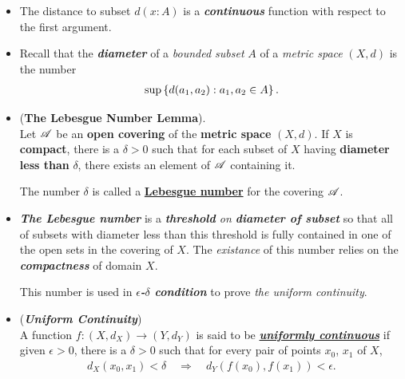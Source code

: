 \documentclass[11pt]{article}
\begin{document}
\begin{itemize}
\item \begin{remark}
The distance to subset $d(x: A)$ is a \emph{\textbf{continuous}} function with respect to the first argument.
\end{remark}


\item \begin{remark}
Recall that the \emph{\textbf{diameter}} of a \emph{bounded subset} $A$ of a \emph{metric space} $(X, d)$ is the number
\begin{align*}
\sup\left\{d(a_1, a_2): a_1, a_2 \in A\right\}.
\end{align*}
\end{remark}


\item \begin{lemma} (\textbf{The Lebesgue Number Lemma}). \citep{munkres2000topology} \\
Let ${\mathscr A}$ be an \textbf{open covering} of the \textbf{metric space} $(X, d)$. If $X$ is \textbf{compact}, there is a $\delta > 0$ such that for each subset of $X$
having \textbf{diameter less than} $\delta$, there exists an element of ${\mathscr A}$ containing it.

The number $\delta$ is called a \underline{\textbf{Lebesgue number}} for the covering ${\mathscr A}$.
\end{lemma}

\item \begin{remark}
\emph{\textbf{The Lebesgue number}} is a \emph{\textbf{threshold} on \textbf{diameter of subset}} so that all of subsets with diameter less than this threshold is fully contained in one of the open sets in the covering of $X$. The \emph{existance} of this number relies on the \emph{\textbf{compactness}} of domain $X$.

This number is used in \emph{\textbf{$\epsilon$-$\delta$ condition}} to prove \emph{the uniform continuity}.
\end{remark}

\item \begin{definition} (\emph{\textbf{Uniform Continuity}})\\
A function $f: (X, d_X) \rightarrow (Y, d_Y)$ is said to be \underline{\emph{\textbf{uniformly continuous}}} if given $\epsilon > 0$, there is a $\delta > 0$ such that for every pair of points $x_0$, $x_1$ of $X$,
\begin{align*}
d_X(x_0, x_1) < \delta \quad \Rightarrow \quad d_Y(f(x_0), f(x_1)) < \epsilon. 
\end{align*}
\end{definition}


\end{itemize}
\end{document}
